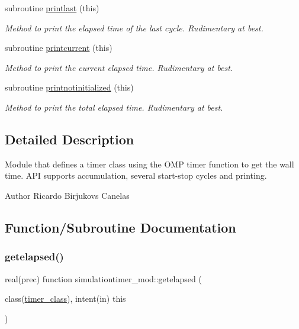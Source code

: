 \begin{DoxyCompactItemize}
subroutine \mbox{\hyperlink{namespacesimulationtimer__mod_ae6e0d8f98a24587daf93cedb4e93ad79}{printlast}} (this)
\begin{DoxyCompactList}\small\item\em Method to print the elapsed time of the last cycle. Rudimentary at best. \end{DoxyCompactList}\item 
subroutine \mbox{\hyperlink{namespacesimulationtimer__mod_abf4d4c3f383597e975e7c9d12dab6f13}{printcurrent}} (this)
\begin{DoxyCompactList}\small\item\em Method to print the current elapsed time. Rudimentary at best. \end{DoxyCompactList}\item 
subroutine \mbox{\hyperlink{namespacesimulationtimer__mod_a1c7581b4e12efde67021c8d94e0ef696}{printnotinitialized}} (this)
\begin{DoxyCompactList}\small\item\em Method to print the total elapsed time. Rudimentary at best. \end{DoxyCompactList}\end{DoxyCompactItemize}


\subsection{Detailed Description}
Module that defines a timer class using the O\+MP timer function to get the wall time. A\+PI supports accumulation, several start-\/stop cycles and printing. 

\begin{DoxyAuthor}{Author}
Ricardo Birjukovs Canelas 
\end{DoxyAuthor}


\subsection{Function/\+Subroutine Documentation}
\mbox{\label{namespacesimulationtimer__mod_a54fa7688c279c747bd76554fb8adb819}} 
\subsubsection{\texorpdfstring{getelapsed()}{getelapsed()}}
{\footnotesize\ttfamily real(prec) function simulationtimer\+\_\+mod\+::getelapsed (\begin{DoxyParamCaption}\item[{class(\mbox{\hyperlink{structsimulationtimer__mod_1_1timer__class}{timer\+\_\+class}}), intent(in)}]{this }\end{DoxyParamCaption})\hspace{0.3cm}{\ttfamily [private]}}



